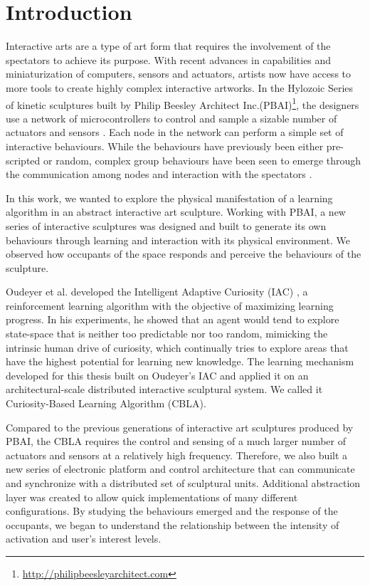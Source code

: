 \chapter{Introduction}

Interactive arts are a type of art form that requires the involvement of the spectators to achieve its purpose. With recent advances in capabilities and miniaturization of computers, sensors and actuators, artists now have access to more tools to create highly complex interactive artworks. In the Hylozoic Series of kinetic sculptures built by Philip Beesley Architect Inc.(PBAI)\footnote{\url{http://philipbeesleyarchitect.com}}, the designers use a network of microcontrollers to control and sample a sizable number of actuators and sensors \cite{Beesley2010.book} \cite{Beesley2007.book}. Each node in the network can perform a simple set of interactive behaviours. While the behaviours have previously been either pre-scripted or random, complex group behaviours have been seen to emerge through the communication among nodes and interaction with the spectators \cite{Beesley2012.book}. 

In this work, we wanted to explore the physical manifestation of a learning algorithm in an abstract interactive art sculpture. Working with PBAI, a new series of interactive sculptures was designed and built to generate its own behaviours through learning and interaction with its physical environment. We observed how occupants of the space responds and perceive the behaviours of the sculpture. 
 
Oudeyer et al. developed the Intelligent Adaptive Curiosity (IAC) \cite{Oudeyer2007}, a reinforcement learning algorithm with the objective of maximizing learning progress. In his experiments, he showed that an agent would tend to explore state-space that is neither too predictable nor too random, mimicking the intrinsic human drive of curiosity, which continually tries to explore areas that have the highest potential for learning new knowledge. The learning mechanism developed for this thesis built on Oudeyer’s IAC and applied it on an architectural-scale distributed interactive sculptural system. We called it Curiosity-Based Learning Algorithm (CBLA). 

Compared to the previous generations of interactive art sculptures produced by PBAI, the CBLA requires the control and sensing of a much larger number of actuators and sensors at a relatively high frequency. Therefore, we also built a new series of electronic platform and control architecture that can communicate and synchronize with a distributed set of sculptural units. Additional abstraction layer was created to allow quick implementations of many different configurations. By studying the behaviours emerged and the response of the occupants, we began to understand the relationship between the intensity of activation and user's interest levels. 


